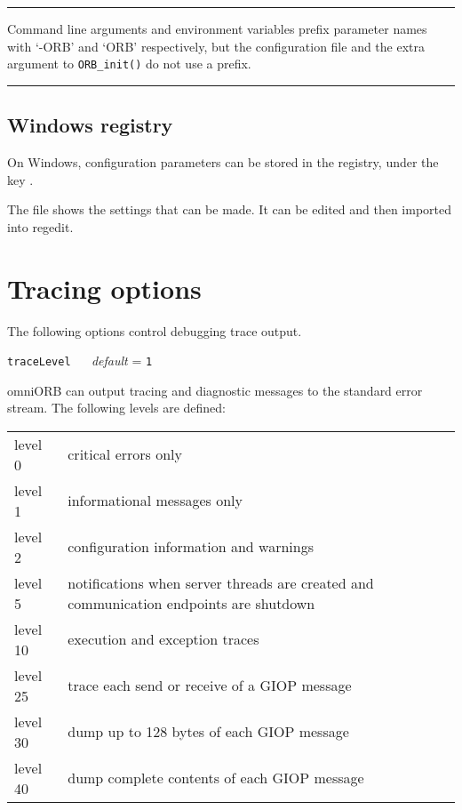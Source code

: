 \documentclass[11pt,oneside,a4paper]{book}
\makeatletter
\newcommand{\code}[1]{\texttt{#1}}
\newcommand{\op}[1]{\texttt{#1()}}
\newenvironment{statement}%
 {\noindent\begin{minipage}{\textwidth}%
  \vspace{.5\baselineskip}%
  \noindent\rule{\textwidth}{2pt}%
  \vspace{.25\baselineskip}%
  \begin{list}{}{\setlength{\listparindent}{0em}%
                 \setlength{\itemindent}{0em}%
                 \setlength{\leftmargin}{1.5em}%
                 \setlength{\rightmargin}{\leftmargin}%
                 \setlength{\topsep}{0pt}%
                 \setlength{\partopsep}{0pt}}
  \item\relax}
 {\end{list}%
  \vspace{-.25\baselineskip}%
  \noindent\rule{\textwidth}{2pt}%
  \vspace{.5\baselineskip}%
  \end{minipage}}
\newcommand{\confopt}[2]
  {\vspace{\baselineskip}\par\noindent\code{#1} ~~ \textit{default} =
   \code{#2}}
\renewcommand{\confopt}[2]
  {\vspace{\baselineskip}\par\noindent\code{#1} ~~ \textit{default} =
   \code{#2}\\[-1ex]\@afterheading}
\makeatother
\begin{document}
\begin{statement}
Command line arguments and environment variables prefix parameter
names with `-ORB' and `ORB' respectively, but the configuration file
and the extra argument to \op{ORB\_init} do not use a prefix.
\end{statement}


\subsection{Windows registry}

On Windows, configuration parameters can be stored in the registry,
under the key .

The file  shows the settings that can be made. It can
be edited and then imported into regedit.



\section{Tracing options}

The following options control debugging trace output.


\confopt{traceLevel}{1}

omniORB can output tracing and diagnostic messages to the standard
error stream. The following levels are defined:

\vspace{\baselineskip}

\begin{tabular}{lp{}}

level 0      & critical errors only\\
level 1      & informational messages only\\
level 2      & configuration information and warnings\\

level 5      & notifications when server threads are
               created and communication endpoints are shutdown\\

level 10     & execution and exception traces\\
level 25     & trace each send or receive of a GIOP message\\
level 30     & dump up to 128 bytes of each GIOP message\\
level 40     & dump complete contents of each GIOP message\\
\end{tabular}
\end{document}
